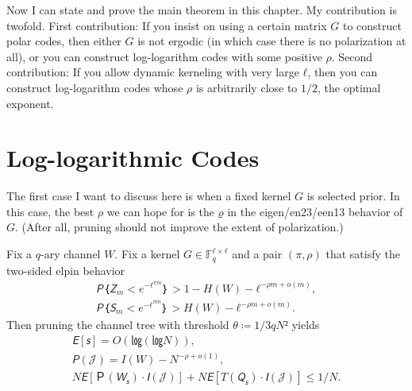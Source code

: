 \documentclass[openany]{amsbook}
\numberwithin{equation}{chapter}
\numberwithin{figure}{chapter}
\numberwithin{table}{chapter}
\theoremstyle{definition}	理dfn:Definition~?s			理exa:Example~?s
\theoremstyle{remark}		理cla:Claim~?s				理rem:Remark~?s
\begin{document}
	Now I can state and prove the main theorem in this chapter.
	My contribution is twofold.
	First contribution:
	If you insist on using a certain matrix $G$ to construct polar codes,
	then either $G$ is not ergodic (in which case there is no polarization at all),
	or you can construct log-logarithm codes with some positive $ρ$.
	Second contribution:
	If you allow dynamic kerneling with very large $ℓ$, then you can construct
	log-logarithm codes whose $ρ$ is arbitrarily close to $1/2$, the optimal exponent.

\section{Log-logarithmic Codes}

	The first case I want to discuss here is when a fixed kernel $G$ is selected prior.
	In this case, the best $ρ$ we can hope for
	is the $ϱ$ in the eigen/en23/een13 behavior of $G$.
	(After all, pruning should not improve the extent of polarization.)
	
	\begin{thm}\label{thm:ll-R-P}
		Fix a $q$-ary channel $W$.
		Fix a kernel $G∈𝔽_q^{ℓ×ℓ}$ and a pair $(π,ρ)$
		that satisfy the two-sided elpin behavior
		\begin{gather*}
			𝘗｛𝘡_m<e^{-ℓ^{πm}}｝>1-H(W)-ℓ^{-ρm+o(m)},	\\
			𝘗｛𝘚_m<e^{-ℓ^{πm}}｝>H(W)-ℓ^{-ρm+o(m)}.	
		\end{gather*}
		Then pruning the channel tree with threshold $θ≔1/3qN²$ yields
		\begin{gather*}
			𝘌[𝘴]=O(㏒(㏒N)),							\\
			𝘗(𝒥)=I(W)-N^{-ρ+o(1)},					\\
			N𝘌[Ｐ(𝘞_𝘴)·𝘐(𝒥)]+N𝘌[T(𝘘_𝘴)·𝘐(𝒥)]≤1/N.	
		\end{gather*}
	\end{thm}
	
\end{document}
